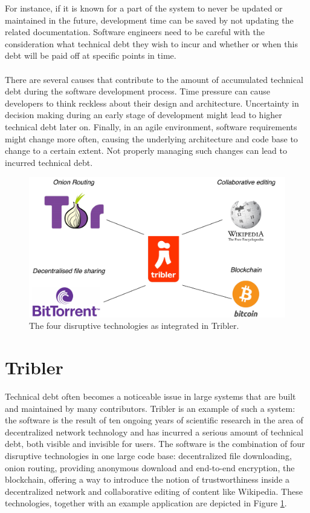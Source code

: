 For instance, if it is known for a part of the system to never be updated or maintained in the future, development time can be saved by not updating the related documentation.
Software engineers need to be careful with the consideration what technical debt they wish to incur and whether or when this debt will be paid off at specific points in time.\\\\
There are several causes that contribute to the amount of accumulated technical debt during the software development process\cite{martini2014architecture}. Time pressure can cause developers to think reckless about their design and architecture. Uncertainty in decision making during an early stage of development might lead to higher technical debt later on. Finally, in an agile environment, software requirements might change more often, causing the underlying architecture and code base to change to a certain extent. Not properly managing such changes can lead to incurred technical debt.

\begin{figure}[b!]
	\centering
	\includegraphics[width=0.6\columnwidth]{images/introduction/tribler_connections}
	\caption{The four disruptive technologies as integrated in Tribler.}
	\label{fig:tribler-connections}
\end{figure}

\section{Tribler}
Technical debt often becomes a noticeable issue in large systems that are built and maintained by many contributors. Tribler is an example of such a system: the software is the result of ten ongoing years of scientific research in the area of decentralized network technology and has incurred a serious amount of technical debt, both visible and invisible for users.
The software is the combination of four disruptive technologies in one large code base: decentralized file downloading, onion routing, providing anonymous download and end-to-end encryption, the blockchain, offering a way to introduce the notion of trustworthiness inside a decentralized network and collaborative editing of content like Wikipedia. These technologies, together with an example application are depicted in Figure \ref{fig:tribler-connections}.\\


